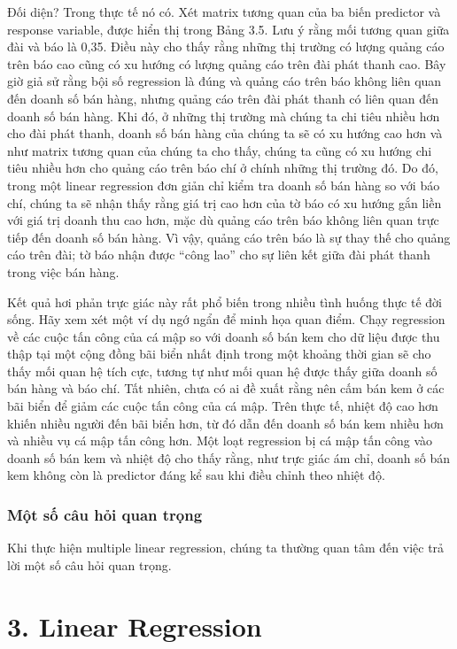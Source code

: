 Đối diện? Trong thực tế nó có. Xét matrix tương quan của ba biến predictor và response variable, được hiển thị trong Bảng 3.5. Lưu ý rằng mối tương quan giữa đài và báo là 0,35. Điều này cho thấy rằng những thị trường có lượng quảng cáo trên báo cao cũng có xu hướng có lượng quảng cáo trên đài phát thanh cao. Bây giờ giả sử rằng bội số regression là đúng và quảng cáo trên báo không liên quan đến doanh số bán hàng, nhưng quảng cáo trên đài phát thanh có liên quan đến doanh số bán hàng. Khi đó, ở những thị trường mà chúng ta chi tiêu nhiều hơn cho đài phát thanh, doanh số bán hàng của chúng ta sẽ có xu hướng cao hơn và như matrix tương quan của chúng ta cho thấy, chúng ta cũng có xu hướng chi tiêu nhiều hơn cho quảng cáo trên báo chí ở chính những thị trường đó. Do đó, trong một linear regression đơn giản chỉ kiểm tra doanh số bán hàng so với báo chí, chúng ta sẽ nhận thấy rằng giá trị cao hơn của tờ báo có xu hướng gắn liền với giá trị doanh thu cao hơn, mặc dù quảng cáo trên báo không liên quan trực tiếp đến doanh số bán hàng. Vì vậy, quảng cáo trên báo là sự thay thế cho quảng cáo trên đài; tờ báo nhận được “công lao” cho sự liên kết giữa đài phát thanh trong việc bán hàng.

Kết quả hơi phản trực giác này rất phổ biến trong nhiều tình huống thực tế đời sống. Hãy xem xét một ví dụ ngớ ngẩn để minh họa quan điểm. Chạy regression về các cuộc tấn công của cá mập so với doanh số bán kem cho dữ liệu được thu thập tại một cộng đồng bãi biển nhất định trong một khoảng thời gian sẽ cho thấy mối quan hệ tích cực, tương tự như mối quan hệ được thấy giữa doanh số bán hàng và báo chí. Tất nhiên, chưa có ai đề xuất rằng nên cấm bán kem ở các bãi biển để giảm các cuộc tấn công của cá mập. Trên thực tế, nhiệt độ cao hơn khiến nhiều người đến bãi biển hơn, từ đó dẫn đến doanh số bán kem nhiều hơn và nhiều vụ cá mập tấn công hơn. Một loạt regression bị cá mập tấn công vào doanh số bán kem và nhiệt độ cho thấy rằng, như trực giác ám chỉ, doanh số bán kem không còn là predictor đáng kể sau khi điều chỉnh theo nhiệt độ.

\subsubsection{Một số câu hỏi quan trọng}

Khi thực hiện multiple linear regression, chúng ta thường quan tâm đến việc trả lời một số câu hỏi quan trọng.

\section{3. Linear Regression}

